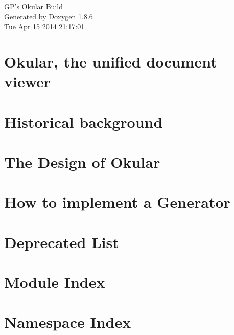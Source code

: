 \documentclass[twoside]{book}
\newcommand{\+}{\discretionary{\mbox{\scriptsize$\hookleftarrow$}}{}{}}
\newcommand{\clearemptydoublepage}{%
  \newpage{\pagestyle{empty}\cleardoublepage}%
}
\begin{document}
\hypersetup{pageanchor=false,
             bookmarks=true,
             bookmarksnumbered=true,
             pdfencoding=unicode
            }
\begin{titlepage}
\vspace*{7cm}
\begin{center}%
{\Large G\+P's Okular Build }\\
\vspace*{1cm}
{\large Generated by Doxygen 1.8.6}\\
\vspace*{0.5cm}
{\small Tue Apr 15 2014 21:17:01}\\
\end{center}
\end{titlepage}
\clearemptydoublepage
\tableofcontents
\clearemptydoublepage
{}
\hypersetup{pageanchor=true}

\chapter{Okular, the unified document viewer}
\label{index}\hypertarget{index}{}
\chapter{Historical background}
\label{okular_history}
\hypertarget{okular_history}{}

\chapter{The Design of Okular}
\label{okular_design}
\hypertarget{okular_design}{}

\chapter{How to implement a Generator}
\label{okular_generators}
\hypertarget{okular_generators}{}

\chapter{Deprecated List}
\label{deprecated}
\hypertarget{deprecated}{}

\chapter{Module Index}

\chapter{Namespace Index}

\end{document}
